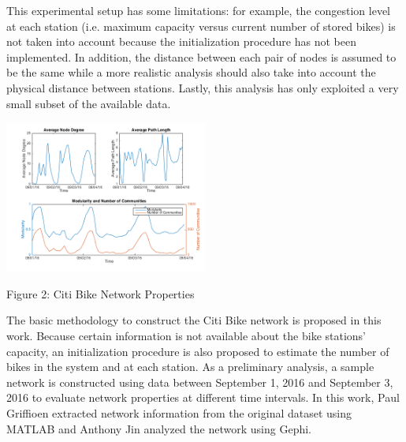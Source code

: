 \documentclass[times, 10pt,twocolumn]{article}
\begin{document}
This experimental setup has some limitations: for example, the congestion level at each station (i.e. maximum capacity versus current number of stored bikes) is not taken into account because the initialization procedure has not been implemented. In addition, the distance between each pair of nodes is assumed to be the same while a more realistic analysis should also take into account the physical distance between stations. Lastly, this analysis has only exploited a very small subset of the available data.







\centerline{\includegraphics[width=0.5\textwidth]{plotterfigure.png}}
\centerline{Figure 2: Citi Bike Network Properties}

The basic methodology to construct the Citi Bike network is proposed in this work. Because certain information is not available about the bike stations' capacity, an initialization procedure is also proposed to estimate the number of bikes in the system and at each station. As a preliminary analysis, a sample network is constructed using data between September 1, 2016 and September 3, 2016 to evaluate network properties at different time intervals. In this work, Paul Griffioen extracted network information from the original dataset using MATLAB and Anthony Jin analyzed the network using Gephi.
\end{document}
